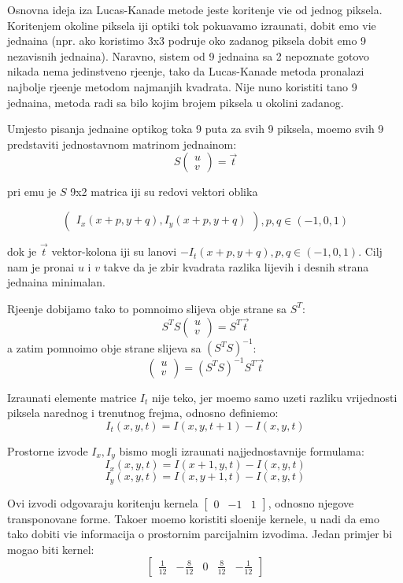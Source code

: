 Osnovna ideja iza Lucas-Kanade metode jeste kori\sh tenje vi\sh e od jednog piksela. Kori\sh tenjem okoline piksela \ch iji opti\ch ki tok poku\sh avamo izra\ch unati, dobit \cj emo vi\sh e jedna\ch ina
(npr. ako koristimo 3x3 podru\ch je oko zadanog piksela dobit \cj emo 9 nezavisnih jedna\ch ina). Naravno, sistem od 9 jedna\ch ina sa 2 nepoznate gotovo nikada nema jedinstveno rje\sh enje,
tako da Lucas-Kanade metoda pronalazi najbolje rje\sh enje metodom najmanjih kvadrata. Nije nu\zh no koristiti ta\ch no 9 jedna\ch ina, metoda radi sa bilo kojim brojem piksela u okolini zadanog.

Umjesto pisanja jedna\ch ine opti\ch kog toka 9 puta za svih 9 piksela, mo\zh emo svih 9 predstaviti jednostavnom matri\ch nom jedna\ch inom\cite{matlablk, lknutshell}:
\[
S
\begin{pmatrix}
u \\
v
\end{pmatrix}
=\vec{t}
\]

pri \ch emu je $S$ 9x2 matrica \ch iji su redovi vektori oblika 

\[
\begin{pmatrix}I_x(x+p,y+q),I_y(x+p,y+q)\end{pmatrix},p,q\in (-1,0,1)
\] 

dok je $\vec{t}$ vektor-kolona \ch iji su \ch lanovi
$-I_t(x+p,y+q),p,q\in (-1,0,1)$. Cilj nam je prona\cj i $u$ i $v$ takve da je zbir kvadrata razlika lijevih i desnih strana jedna\ch ina minimalan.

Rje\sh enje dobijamo tako \sh to pomno\zh imo slijeva obje strane sa $S^T$:
\[
S^TS\begin{pmatrix}u \\ v\end{pmatrix}=S^T\vec{t}
\]
a zatim pomno\zh imo obje strane slijeva sa $(S^TS)^{-1}$:
\[
\begin{pmatrix}u \\ v\end{pmatrix}=(S^TS)^{-1}S^T\vec{t}
\]

Izra\ch unati elemente matrice $I_t$ nije te\sh ko, jer mo\zh emo samo uzeti razliku vrijednosti piksela narednog i trenutnog frejma, odnosno defini\sh emo:
\[
I_t(x,y,t)=I(x,y,t+1)-I(x,y,t)
\]

Prostorne izvode $I_x,I_y$ bismo mogli izra\ch unati najjednostavnije formulama:
\[
I_x(x,y,t)=I(x+1,y,t)-I(x,y,t)
\]
\[
I_y(x,y,t)=I(x,y+1,t)-I(x,y,t)
\]

Ovi izvodi odgovaraju kori\sh tenju kernela $\begin{bmatrix}0 & -1 & 1\end{bmatrix}$, odnosno njegove transponovane forme. Tako\dj er mo\zh emo koristiti
slo\zh enije kernele, u nadi da \cj emo tako dobiti vi\sh e informacija o prostornim parcijalnim izvodima. Jedan primjer bi mogao biti kernel:
\[
\begin{bmatrix}
\frac{1}{12} & -\frac{8}{12} & 0 & \frac{8}{12} & -\frac{1}{12}
\end{bmatrix}
\]

